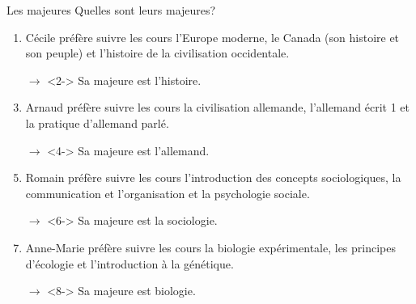\begin{frame}{Les majeures}
  Quelles sont leurs majeures?
  \begin{enumerate}
    \item Cécile préfère suivre les cours l'Europe moderne, le Canada (son histoire et son peuple) et l'histoire de la civilisation occidentale.
    \item[$\to$]<2-> Sa majeure est l'histoire.
    \item<3-> Arnaud préfère suivre les cours la civilisation allemande, l'allemand écrit 1 et la pratique d'allemand parlé.
    \item[$\to$]<4-> Sa majeure est l'allemand.
    \item<5-> Romain préfère suivre les cours l'introduction des concepts sociologiques, la communication et l'organisation et la psychologie sociale.
    \item[$\to$]<6-> Sa majeure est la sociologie.
    \item<7-> Anne-Marie préfère suivre les cours la biologie expérimentale, les principes d'écologie et l'introduction à la génétique.
    \item[$\to$]<8-> Sa majeure est biologie.
  \end{enumerate}
\end{frame}
